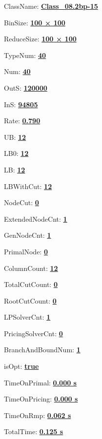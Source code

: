 \documentclass[11pt]{article}
\begin{document}
\pagestyle{empty}


ClassName: \underline{\textbf{Class_08.2bp-15}}
\par
BinSize: \underline{\textbf{100 × 100}}
\par
ReduceSize: \underline{\textbf{100 × 100}}
\par
TypeNum: \underline{\textbf{40}}
\par
Num: \underline{\textbf{40}}
\par
OutS: \underline{\textbf{120000}}
\par
InS: \underline{\textbf{94805}}
\par
Rate: \underline{\textbf{0.790}}
\par
UB: \underline{\textbf{12}}
\par
LB0: \underline{\textbf{12}}
\par
LB: \underline{\textbf{12}}
\par
LBWithCut: \underline{\textbf{12}}
\par
NodeCut: \underline{\textbf{0}}
\par
ExtendedNodeCnt: \underline{\textbf{1}}
\par
GenNodeCnt: \underline{\textbf{1}}
\par
PrimalNode: \underline{\textbf{0}}
\par
ColumnCount: \underline{\textbf{12}}
\par
TotalCutCount: \underline{\textbf{0}}
\par
RootCutCount: \underline{\textbf{0}}
\par
LPSolverCnt: \underline{\textbf{1}}
\par
PricingSolverCnt: \underline{\textbf{0}}
\par
BranchAndBoundNum: \underline{\textbf{1}}
\par
isOpt: \underline{\textbf{true}}
\par
TimeOnPrimal: \underline{\textbf{0.000 s}}
\par
TimeOnPricing: \underline{\textbf{0.000 s}}
\par
TimeOnRmp: \underline{\textbf{0.062 s}}
\par
TotalTime: \underline{\textbf{0.125 s}}
\par
\newpage


\end{document}
